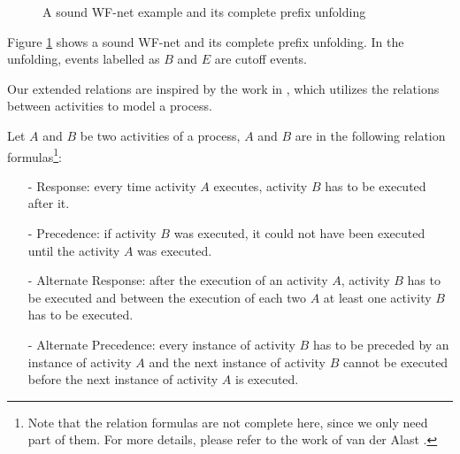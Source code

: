 \documentclass{llncs}
\begin{document}
\begin{figure}[htbp]
\centering
{}
\caption{A sound WF-net example and its complete prefix unfolding\label{fig:examplePetriAndCpu}}
\end{figure}

\begin{example}\label{ex:petriAndCpu}
Figure \ref{fig:examplePetriAndCpu} shows a sound WF-net and its complete prefix unfolding. In the unfolding, events labelled as $B$ and $E$ are cutoff events.
\end{example}

Our extended relations are inspired by the work in \cite{van2006decserflow}, which utilizes the relations between activities to model a process.
\begin{definition}\label{def:relationFormulas}
Let $A$ and $B$ be two activities of a process, $A$ and $B$ are in the following relation formulas\footnote{Note that the relation formulas are not complete here, since we only need part of them. For more details, please refer to the work of van der Alast \cite{van2006decserflow}.}:
	\begin{itemize}
		\item[-] Response: every time activity $A$ executes, activity $B$ has to be executed after it.
		\item[-] Precedence: if activity $B$ was executed, it could not have been executed until the activity $A$ was executed.
		\item[-] Alternate Response: after the execution of an activity $A$, activity $B$ has to be executed and between the execution of each two $A$ at least one activity $B$ has to be executed.
		\item[-] Alternate Precedence: every instance of activity $B$ has to be preceded by an instance of activity $A$ and the next instance of activity $B$ cannot be executed before the next instance of activity $A$ is executed.
	\end{itemize}
\end{definition}
\end{document}
